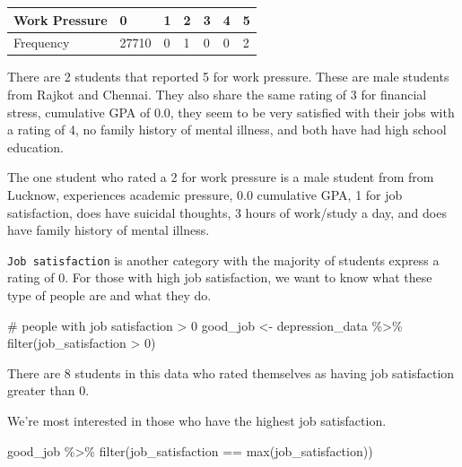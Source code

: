 \documentclass[
  letterpaper,
  DIV=11,
  numbers=noendperiod]{scrartcl}
\newenvironment{Shaded}{\begin{snugshade}}{\end{snugshade}}
\newcommand{\CommentTok}[1]{\textcolor[rgb]{0.37,0.37,0.37}{#1}}
\newcommand{\DecValTok}[1]{\textcolor[rgb]{0.68,0.00,0.00}{#1}}
\newcommand{\FunctionTok}[1]{\textcolor[rgb]{0.28,0.35,0.67}{#1}}
\newcommand{\NormalTok}[1]{\textcolor[rgb]{0.00,0.23,0.31}{#1}}
\newcommand{\OtherTok}[1]{\textcolor[rgb]{0.00,0.23,0.31}{#1}}
\newcommand{\SpecialCharTok}[1]{\textcolor[rgb]{0.37,0.37,0.37}{#1}}
\begin{document}
\begin{longtable}[]{@{}lllllll@{}}
\toprule\noalign{}
Work Pressure & 0 & 1 & 2 & 3 & 4 & 5 \\
\midrule\noalign{}
\endhead
\bottomrule\noalign{}
\endlastfoot
Frequency & 27710 & 0 & 1 & 0 & 0 & 2 \\
\end{longtable}

There are 2 students that reported 5 for work pressure. These are male
students from Rajkot and Chennai. They also share the same rating of 3
for financial stress, cumulative GPA of 0.0, they seem to be very
satisfied with their jobs with a rating of 4, no family history of
mental illness, and both have had high school education.

The one student who rated a 2 for work pressure is a male student from
from Lucknow, experiences academic pressure, 0.0 cumulative GPA, 1 for
job satisfaction, does have suicidal thoughts, 3 hours of work/study a
day, and does have family history of mental illness.

\texttt{Job\ satisfaction} is another category with the majority of
students express a rating of 0. For those with high job satisfaction, we
want to know what these type of people are and what they do.

\begin{Shaded}
\begin{Highlighting}[numbers=left,,]
\CommentTok{\# people with job satisfaction \textgreater{} 0}
\NormalTok{good\_job }\OtherTok{\textless{}{-}}\NormalTok{ depression\_data }\SpecialCharTok{\%\textgreater{}\%} \FunctionTok{filter}\NormalTok{(job\_satisfaction }\SpecialCharTok{\textgreater{}} \DecValTok{0}\NormalTok{)}
\end{Highlighting}
\end{Shaded}

There are 8 students in this data who rated themselves as having job
satisfaction greater than 0.

We're most interested in those who have the highest job satisfaction.

\begin{Shaded}
\begin{Highlighting}[numbers=left,,]
\NormalTok{good\_job }\SpecialCharTok{\%\textgreater{}\%} \FunctionTok{filter}\NormalTok{(job\_satisfaction }\SpecialCharTok{==} \FunctionTok{max}\NormalTok{(job\_satisfaction))}
\end{Highlighting}
\end{Shaded}
\end{document}
